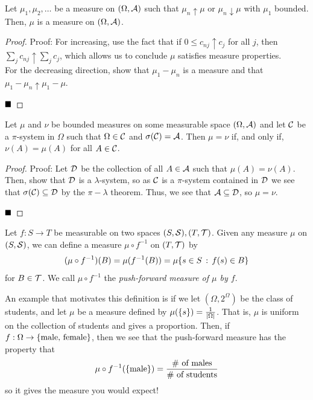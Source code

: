 
\begin{lemma}
    Let $\mu_1, \mu_2, \ldots$ be a measure on $(\Omega, \cal{A})$ such that $\mu_n \uparrow \mu$ or $\mu_n \downarrow \mu$ with $\mu_1$ bounded. Then, $\mu$ is a measure on $(\Omega, \cal{A})$. 
\end{lemma}
\begin{proof}{Proof:}
    For increasing, use the fact that if $0 \leq c_{nj} \uparrow c_j$ for all $j$, then $\sum_{j} c_{nj} \uparrow \sum_{j} c_j$, which allows us to conclude $\mu$ satisfies measure properties.\\

    For the decreasing direction, show that $\mu_1 - \mu_n$ is a measure and that $\mu_1 - \mu_n \uparrow \mu_1 - \mu$. 

    $\qed$
\end{proof}

\begin{lemma}
    Let $\mu$ and $\nu$ be bounded measures on some measurable space $(\Omega, \cal{A})$ and let $\cal{C}$ be a $\pi$-system in $\Omega$ such that $\Omega \in \cal{C}$ and $\sigma(\cal{C}) = \cal{A}$. Then $\mu = \nu$ if, and only if, $\nu(A) = \mu(A)$ for all $A \in \cal{C}$.
\end{lemma}
\begin{proof}{Proof:}
    Let $\cal{D}$ be the collection of all $A \in \cal{A}$ such that $\mu(A) = \nu(A)$. Then, show that $\cal{D}$ is a $\lambda$-system, so as $\cal{C}$ is a $\pi$-system contained in $\cal{D}$ we see that $\sigma(\cal{C}) \subseteq \cal{D}$ by the $\pi-\lambda$ theorem. Thus, we see that $\cal{A} \subseteq \cal{D}$, so $\mu = \nu$. 

    $\qed$
\end{proof}

\begin{definition}
    Let $f : S \to T$ be measurable on two spaces $(S, \cal{S}), (T, \cal{T})$. Given any measure $\mu$ on $(S, \cal{S})$, we can define a measure $\mu \circ f^{-1}$ on $(T, \cal{T})$ by
    \[ (\mu \circ f^{-1})(B) = \mu(f^{-1}(B)) = \mu\{s \in S \col f(s) \in B\} \]
    for $B \in \cal{T}$. We call $\mu \circ f^{-1}$ the \emph{push-forward measure of $\mu$ by $f$}. 
\end{definition}

An example that motivates this definition is if we let $(\Omega, 2^{\Omega})$ be the class of students, and let $\mu$ be a measure defined by $\mu(\{s\}) = \frac{1}{\abs{\Omega}}$. That is, $\mu$ is uniform on the collection of students and gives a proportion. Then, if $f : \Omega \to \{\tt{male, female}\}$, then we see that the push-forward measure has the property that
\[ \mu \circ f^{-1}(\{\tt{male}\}) = \frac{\# \text{ of males}}{\# \text{ of students}} \]
so it gives the measure you would expect!\\

